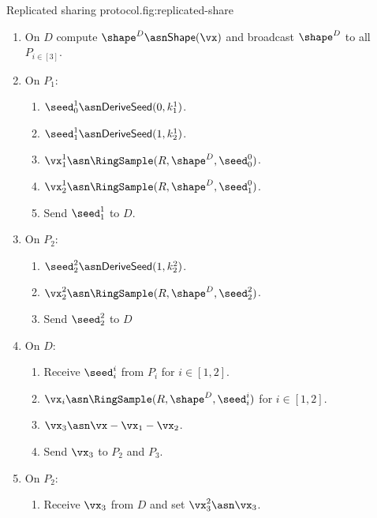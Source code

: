 \begin{Boxfig}{Replicated sharing protocol.}{fig:replicated-share}
\begin{enumerate}
      \begin{enumerate}
        \item On $D$ compute $\shape^D \asn \mathsf{Shape}(\vx)$ and broadcast $\shape^D$ to all $P_{i \in [3]}$.

        \item On $P_1$:
        \begin{enumerate}
          \item $\seed_0^1 \asn \mathsf{DeriveSeed}(0, k_1^1)$.
          \item $\seed_1^1 \asn \mathsf{DeriveSeed}(1, k_2^1)$.
          \item $\vx_1^1 \asn \RingSample(R, \shape^D, \seed_0^0)$.
          \item $\vx_2^1 \asn \RingSample(R, \shape^D, \seed_1^0)$.
          \item Send $\seed_1^1$ to $D$.
        \end{enumerate}

        \item On $P_2$:
        \begin{enumerate}
          \item $\seed_2^2 \asn \mathsf{DeriveSeed}(1, k_2^2)$.
          \item $\vx_2^2 \asn \RingSample(R, \shape^D, \seed_2^2)$.
          \item Send $\seed_2^2$ to $D$
        \end{enumerate}

        \item On $D$:
        \begin{enumerate}
          \item Receive $\seed_i^i$ from $P_i$ for $i \in [1, 2]$.
          \item $\vx_i \asn \RingSample(R, \shape^D, \seed_i^i)$ for $i \in [1, 2]$.
          \item $\vx_3 \asn \vx - \vx_1 - \vx_2$.
          \item Send $\vx_3$ to $P_2$ and $P_3$.
        \end{enumerate}

        \item On $P_2$:
        \begin{enumerate}
          \item Receive $\vx_3$ from $D$ and set $\vx_3^2 \asn \vx_3$.
        \end{enumerate}


\end{enumerate}
\end{enumerate}
\end{Boxfig}
